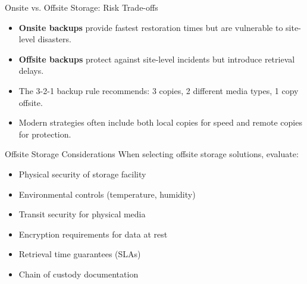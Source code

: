 \documentclass{beamer}
\begin{document}
\begin{frame}{Onsite vs. Offsite Storage: Risk Trade-offs}
    \begin{itemize}
        \item \textbf{Onsite backups} provide fastest restoration times but are vulnerable to site-level disasters.
        \item \textbf{Offsite backups} protect against site-level incidents but introduce retrieval delays.
        \item The 3-2-1 backup rule recommends: 3 copies, 2 different media types, 1 copy offsite.
        \item Modern strategies often include both local copies for speed and remote copies for protection.
    \end{itemize}
    
    \begin{alertblock}{Offsite Storage Considerations}
        \scriptsize
        When selecting offsite storage solutions, evaluate:
        \begin{itemize}
            \item Physical security of storage facility
            \item Environmental controls (temperature, humidity)
            \item Transit security for physical media
            \item Encryption requirements for data at rest
            \item Retrieval time guarantees (SLAs)
            \item Chain of custody documentation
        \end{itemize}
    \end{alertblock}
\end{frame}
\end{document}
